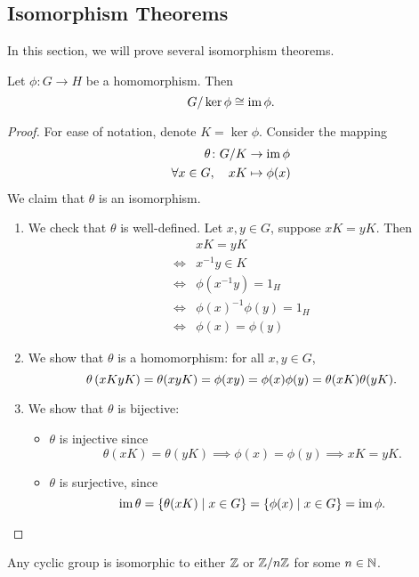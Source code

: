 \subsection{Isomorphism Theorems}
In this section, we will prove several isomorphism theorems.

\begin{theorem}
Let $\phi\colon G\to H$ be a homomorphism. Then
\begin{equation}
G/\ker\phi\cong\operatorname{im}\phi.
\end{equation}
\end{theorem}

\begin{proof}
For ease of notation, denote $K=\ker\phi$. 
Consider the mapping
\begin{align*}
\theta\colon G/K&\to\operatorname{im}\phi\\
\forall x\in G,\quad xK&\mapsto\phi(x)
\end{align*}
We claim that $\theta$ is an isomorphism.
\begin{enumerate}
\item We check that $\theta$ is well-defined. Let $x,y\in G$, suppose $xK=yK$. Then
\begin{align*}
&xK=yK\\
\iff& x^{-1}y\in K\\
\iff&\phi(x^{-1}y)=1_H\\
\iff&\phi(x)^{-1}\phi(y)=1_H\\
\iff&\phi(x)=\phi(y)
\end{align*}

\item We show that $\theta$ is a homomorphism: for all $x,y\in G$,
\[\theta\left(xKyK\right)=\theta(xyK)=\phi(xy)=\phi(x)\phi(y)=\theta(xK)\theta(yK).\]

\item We show that $\theta$ is bijective:
\begin{itemize}
\item $\theta$ is injective since
\[\theta(xK)=\theta(yK)\implies\phi(x)=\phi(y)\implies xK=yK.\]
\item $\theta$ is surjective, since
\[\operatorname{im}\theta=\{\theta(xK)\mid x\in G\}
=\{\phi(x)\mid x\in G\}
=\operatorname{im}\phi.\]
\end{itemize}
\end{enumerate}
\end{proof}

\begin{corollary}
Any cyclic group is isomorphic to either $\mathbb Z$ or $\mathbb Z/n\mathbb Z$ for some $n\in\mathbb N$.
\end{corollary}

